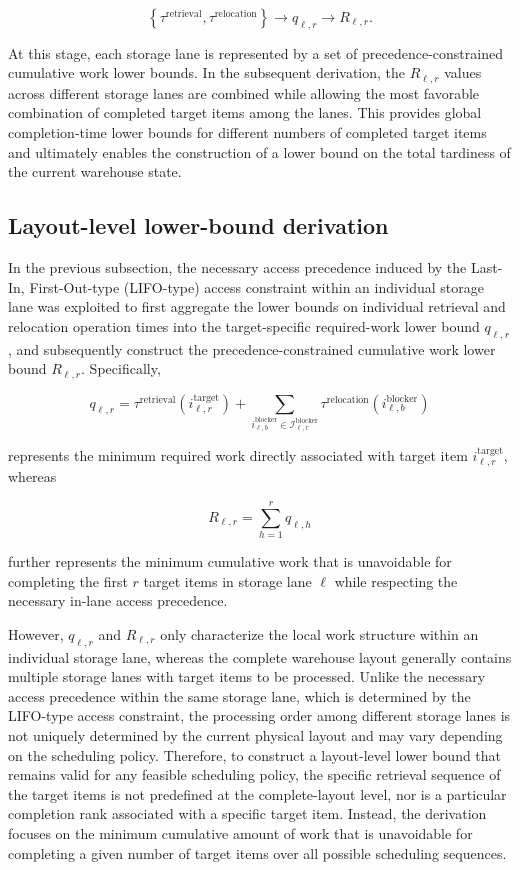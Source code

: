 \[
\left\{
\tau^{\mathrm{retrieval}},
\tau^{\mathrm{relocation}}
\right\}
\longrightarrow
q_{\ell,r}
\longrightarrow
R_{\ell,r}.
\]

At this stage, each storage lane is represented by a set of
precedence-constrained cumulative work lower bounds. In the subsequent
derivation, the \(R_{\ell,r}\) values across different storage lanes are
combined while allowing the most favorable combination of completed target
items among the lanes. This provides global completion-time lower bounds for
different numbers of completed target items and ultimately enables the
construction of a lower bound on the total tardiness of the current warehouse
state.

\subsection{Layout-level lower-bound derivation}

In the previous subsection, the necessary access precedence induced by the
Last-In, First-Out-type (LIFO-type) access constraint within an individual
storage lane was exploited to first aggregate the lower bounds on individual
retrieval and relocation operation times into the target-specific
required-work lower bound \(q_{\ell,r}\), and subsequently construct the
precedence-constrained cumulative work lower bound \(R_{\ell,r}\). Specifically,

\[
q_{\ell,r}
=
\tau^{\mathrm{retrieval}}
\left(
i^{\mathrm{target}}_{\ell,r}
\right)
+
\sum_{
i^{\mathrm{blocker}}_{\ell,b}
\in
\mathcal{I}^{\mathrm{blocker}}_{\ell,r}
}
\tau^{\mathrm{relocation}}
\left(
i^{\mathrm{blocker}}_{\ell,b}
\right)
\]

represents the minimum required work directly associated with target item
\(i^{\mathrm{target}}_{\ell,r}\), whereas

\[
R_{\ell,r}
=
\sum_{h=1}^{r}
q_{\ell,h}
\]

further represents the minimum cumulative work that is unavoidable for
completing the first \(r\) target items in storage lane \(\ell\) while
respecting the necessary in-lane access precedence.

However, \(q_{\ell,r}\) and \(R_{\ell,r}\) only characterize the local work
structure within an individual storage lane, whereas the complete warehouse
layout generally contains multiple storage lanes with target items to be
processed. Unlike the necessary access precedence within the same storage lane,
which is determined by the LIFO-type access constraint, the processing order
among different storage lanes is not uniquely determined by the current
physical layout and may vary depending on the scheduling policy. Therefore, to
construct a layout-level lower bound that remains valid for any feasible
scheduling policy, the specific retrieval sequence of the target items is not
predefined at the complete-layout level, nor is a particular completion rank
associated with a specific target item. Instead, the derivation focuses on the
minimum cumulative amount of work that is unavoidable for completing a given
number of target items over all possible scheduling sequences.

